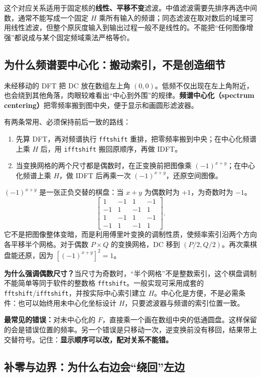 这个对应关系适用于固定核的\textbf{线性、平移不变}滤波。中值滤波需要先排序再选中间数，通常不能写成一个固定 $H$ 乘所有输入的频谱；同态滤波在取对数后的域里可用线性滤波，但整个原灰度输入到输出过程一般不是线性的。不能把“任何图像增强”都说成与某个固定频域乘法严格等价。

\subsection{为什么频谱要中心化：搬动索引，不是创造细节}

未经移动的 DFT 把 DC 放在数组左上角 $(0,0)$。低频不仅出现在左上角附近，也会绕到其他角落，肉眼较难看出“中心到外围”的规律。\textbf{频谱中心化（spectrum centering）}把零频率搬到图中央，便于显示和画圆形滤波器。

有两条常用、必须保持前后一致的路线：
\begin{enumerate}[label=\arabic*.]
\item 先算 DFT，再对频谱执行 \texttt{fftshift} 重排，把零频率搬到中央；在中心化频谱上乘 $H$ 后，用 \texttt{ifftshift} 搬回原顺序，再做 IDFT。
\item 当变换网格的两个尺寸都是偶数时，在正变换前把图像乘 $(-1)^{x+y}$；在中心化频谱上乘 $H$，做 IDFT 后再乘一次 $(-1)^{x+y}$，还原空间图像。
\end{enumerate}

$(-1)^{x+y}$ 是一张正负交替的棋盘：当 $x+y$ 为偶数时为 $+1$，为奇数时为 $-1$。
\[
\begin{bmatrix}
1&-1&1&-1\\-1&1&-1&1\\1&-1&1&-1\\-1&1&-1&1
\end{bmatrix}.
\]
它不是把图像整体变暗，而是利用傅里叶变换的调制性质，使频率索引沿两个方向各平移半个网格。对于偶数 $P\times Q$ 的变换网格，DC 移到 $(P/2,Q/2)$。再次乘棋盘能还原，因为 $[(-1)^{x+y}]^2=1$。

\textbf{为什么强调偶数尺寸？}当尺寸为奇数时，“半个网格”不是整数索引，这个棋盘调制不能简单等同于软件的整数格 \texttt{fftshift}。一般实现可采用成套的 \texttt{fftshift}/\texttt{ifftshift}，并按实际中心索引建立 $H$。中心化是方便，不是必需条件：也可以始终用未中心化坐标设计 $H$，只要滤波器与频谱的索引位置一致。

\textbf{最常见的错误：}对未中心化的 $F$，直接乘一个画在数组中央的低通圆盘。这样保留的会是错误位置的频率。另一个错误是只移动一次，逆变换前没有移回，结果带上交替符号。记住：\textbf{显示顺序可以改，配对关系不能错。}

\subsection{补零与边界：为什么右边会“绕回”左边}

